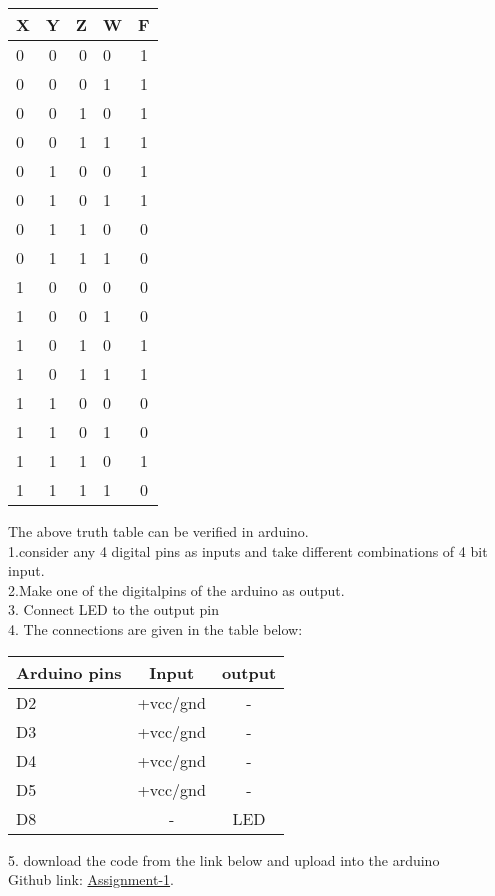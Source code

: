 \documentclass[10pt,a4paper]{report}
\begin{document}
\begin{multicols}{2}
  \begin{center}
    \label{tab:truthtable}
    \setlength{\arrayrulewidth}{0.5mm}
\setlength{\tabcolsep}{18pt}
\renewcommand{\arraystretch}{1.5}
    \begin{tabular}{|l|c|r|l|c|}
    \hline %
      \textbf{X} & \textbf{Y} & \textbf{Z} & \textbf{W} & \textbf{F}\\
      \hline
      0 & 0 & 0 & 0 & 1\\
      0 & 0 & 0 & 1 & 1\\
      0 & 0 & 1 & 0 & 1\\
      0 & 0 & 1 & 1 & 1\\
      0 & 1 & 0 & 0 & 1\\
      0 & 1 & 0 & 1 & 1\\
      0 & 1 & 1 & 0 & 0\\
      0 & 1 & 1 & 1 & 0\\
      1 & 0 & 0 & 0 & 0\\
      1 & 0 & 0 & 1 & 0\\
      1 & 0 & 1 & 0 & 1\\
      1 & 0 & 1 & 1 & 1\\
      1 & 1 & 0 & 0 & 0\\
      1 & 1 & 0 & 1 & 0\\
      1 & 1 & 1 & 0 & 1\\
      1 & 1 & 1 & 1 & 0\\
      \hline
      
    \end{tabular}
  \end{center}

 
 \raggedright The above truth table can be verified in arduino.\\1.consider any 4 digital pins as inputs and take different combinations of 4 bit input.\\2.Make one of the digitalpins of the arduino as output.\\3. Connect LED to the output pin \\4. The connections are given in the table below:

 \begin{center}
 \setlength{\arrayrulewidth}{0.5mm}
\setlength{\tabcolsep}{15pt}
\renewcommand{\arraystretch}{1.5}
    \begin{tabular}{|l|c|c|}
    \hline 
    \textbf{Arduino pins} & \textbf{Input} & \textbf{output} \\
    \hline
    D2 & +vcc/gnd & -\\
    D3 & +vcc/gnd & -\\
    D4 & +vcc/gnd & -\\
    D5 & +vcc/gnd & -\\
    D8 & - & LED\\
    \hline
      \end{tabular}
  \end{center}
\raggedright 5. download the code from the link below and upload into the arduino\\
Github link: \href{https://github.com/lakshmikamakshi/FWC/tree/main/codes}{Assignment-1}.



  \end{multicols}
\end{document}
